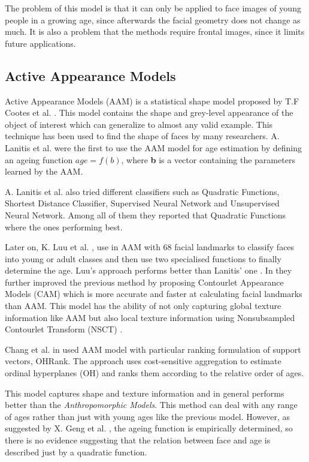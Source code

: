 The problem of this model is that it can only be applied to face images of young people in a growing age, since afterwards the facial geometry does not change as much. It is also a problem that the methods require frontal images, since it limits future applications.

\subsection{Active Appearance Models}\label{subsec:AAM}

Active Appearance Models (AAM) is a statistical shape model proposed by T.F Cootes et al. \cite{Cootes:2001:AAM:378040.378090}. This model contains the shape and grey-level appearance of the object of interest which can generalize to almost any valid example. This technique has been used to find the shape of faces by many researchers. A. Lanitis et al. \cite{791208} \cite{993553} \cite{Lanitis:2004:CDC:2225304.2226166} were the first to use the AAM model for age estimation by defining an ageing function $age=f(b)$, where \textbf{b} is a vector containing the parameters learned by the AAM.

A. Lanitis et al. \cite{Lanitis:2004:CDC:2225304.2226166} also tried different classifiers such as Quadratic Functions, Shortest Distance Classifier, Supervised Neural Network and Unsupervised Neural Network. Among all of them they reported that Quadratic Functions where the ones performing best.

Later on, K. Luu et al. \cite{Luu:2009:AEU:1736406.1736456, LuuSSBS11}, use in \cite{Luu:2009:AEU:1736406.1736456} AAM with 68 facial landmarks to classify faces into young or adult classes and then use two specialised functions to finally determine the age. Luu's approach performs better than Lanitis' one \cite{Lanitis:2004:CDC:2225304.2226166}. In \cite{LuuSSBS11} they further improved the previous method by proposing Contourlet Appearance Models (CAM) which is more accurate and faster at calculating facial landmarks than AAM. This model has the ability of not only capturing global texture information like AAM but also local texture information using Nonsubsampled Contourlet Transform (NSCT) \cite{1703596}.

Chang et al. in \cite{5995437} used AAM model with particular ranking formulation of support vectors, OHRank. The approach uses cost-sensitive aggregation to estimate ordinal hyperplanes (OH) and ranks them according to the relative order of ages.

This model captures shape and texture information and in general performs better than the \textit{Anthropomorphic Models}. This method can deal with any range of ages rather than just with young ages like the previous model. However, as suggested by X. Geng et al. \cite{Geng:2006:LFA:1180639.1180711}, the ageing function is empirically determined, so there is no evidence suggesting that the relation between face and age is described just by a quadratic function.

